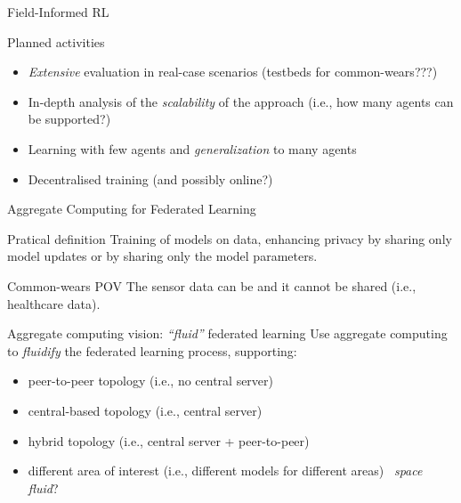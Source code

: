 \documentclass[presentation, 9pt, aspectratio=169]{beamer}\mode<presentation>{\usetheme{AMSBolognaFC}}
\begin{document}
\begin{frame}{Field-Informed RL}
	\begin{exampleblock}{Planned activities}
		\begin{itemize}
			\item \emph{Extensive} evaluation in real-case scenarios (testbeds for common-wears???)
			\item In-depth analysis of the \emph{scalability} of the approach (i.e., how many agents can be supported?)
			\item Learning with few agents and \emph{generalization} to many agents
			\item Decentralised training (and possibly online?)
		\end{itemize}
	\end{exampleblock}
\end{frame}
\begin{frame}{Aggregate Computing for Federated Learning}
	\begin{alertblock}{Pratical definition}
		Training of  models on  data, enhancing privacy by sharing only model updates or by sharing only the model parameters.
	\end{alertblock}
	\begin{exampleblock}{Common-wears POV}
		The sensor data can be  and it cannot be shared (i.e., healthcare data).
	\end{exampleblock}
	\begin{exampleblock}{Aggregate computing vision: \emph{``fluid''} federated learning}
		Use aggregate computing to \emph{fluidify} the federated learning process, supporting:
		\begin{itemize}
			\item peer-to-peer topology (i.e., no central server)
			\item central-based topology (i.e., central server)
			\item hybrid topology (i.e., central server + peer-to-peer)
			\item different area of interest (i.e., different models for different areas) \faArrowRight \, \emph{space fluid}?
		\end{itemize}
	\end{exampleblock}
\end{frame}
\end{document}
